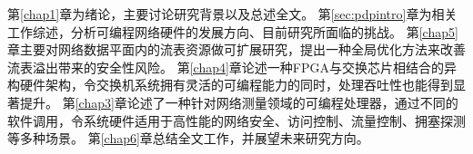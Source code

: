 第\ref{chap1}章为绪论，主要讨论研究背景以及总述全文。
第\ref{sec:pdpintro}章为相关工作综述，分析可编程网络硬件的发展方向、目前研究所面临的挑战。
第\ref{chap5}章主要对网络数据平面内的流表资源做可扩展研究，提出一种全局优化方法来改善流表溢出带来的安全性风险。
第\ref{chap4}章论述一种FPGA与交换芯片相结合的异构硬件架构，令交换机系统拥有灵活的可编程能力的同时，处理吞吐性也能得到显著提升。
第\ref{chap3}章论述了一种针对网络测量领域的可编程处理器，通过不同的软件调用，令系统硬件适用于高性能的网络安全、访问控制、流量控制、拥塞探测等多种场景。
第\ref{chap6}章总结全文工作，并展望未来研究方向。









































